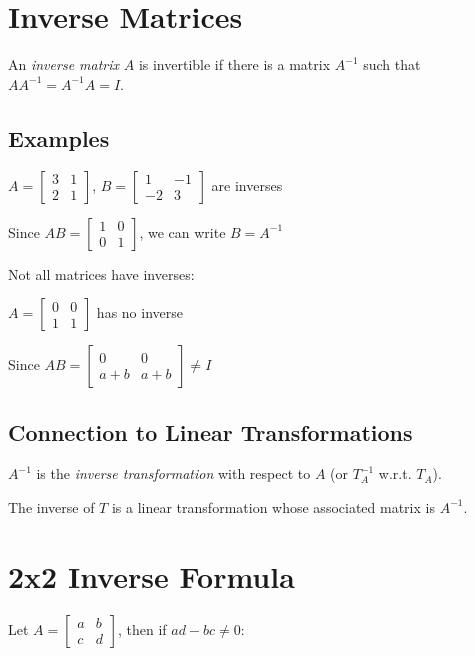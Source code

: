 \documentclass[12pt,a4paper]{article}
\begin{document}
\section{Inverse Matrices}

An \textit{inverse matrix} $A$ is invertible if there is a matrix $A^{-1}$ such that $AA^{-1} = A^{-1}A = I$.

\subsection{Examples}

$A = \begin{bmatrix} 3 & 1 \\ 2 & 1 \end{bmatrix}$, $B = \begin{bmatrix} 1 & -1 \\ -2 & 3 \end{bmatrix}$ are inverses

Since $AB = \begin{bmatrix} 1 & 0 \\ 0 & 1 \end{bmatrix}$, we can write $B = A^{-1}$

Not all matrices have inverses:

$A = \begin{bmatrix} 0 & 0 \\ 1 & 1 \end{bmatrix}$ has no inverse

Since $AB = \begin{bmatrix} 0 & 0 \\ a+b & a+b \end{bmatrix} \neq I$

\subsection{Connection to Linear Transformations}

$A^{-1}$ is the \textit{inverse transformation} with respect to $A$ (or $T_A^{-1}$ w.r.t. $T_A$).

The inverse of $T$ is a linear transformation whose associated matrix is $A^{-1}$.

\section{2x2 Inverse Formula}

Let $A = \begin{bmatrix} a & b \\ c & d \end{bmatrix}$, then if $ad-bc \neq 0$:
\end{document}
